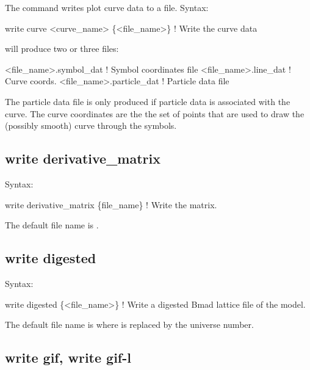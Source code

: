 {{{{{{{{{The  command writes plot curve data to a file.
Syntax:
\begin{example}
    write curve <curve_name> \{<file_name>\} ! Write the curve data
\end{example}

 will produce two or three files:
\begin{example}
  <file_name>.symbol_dat    ! Symbol coordinates file
  <file_name>.line_dat      ! Curve coords.
  <file_name>.particle_dat  ! Particle data file
\end{example}
The particle data file is only produced if particle data is associated with the curve.
The curve coordinates are the the set of points that are used to draw the (possibly
smooth) curve through the symbols.



\subsection{write derivative_matrix}
\label{s:write.deriv.matrix}

Syntax:
\begin{example}
    write derivative_matrix \{file_name\}    ! Write the  matrix.
\end{example}

The default file name is . 


\subsection{write digested}
\label{s:write.digested}

Syntax:
\begin{example}
    write digested \{<file_name>\}      ! Write a digested Bmad lattice file of the model.
\end{example}

The default file name is  where \vn{\#} is replaced by the universe number. 



\subsection{write gif, write gif-l}
\label{s:write.gif}

}}}}}}}}}
